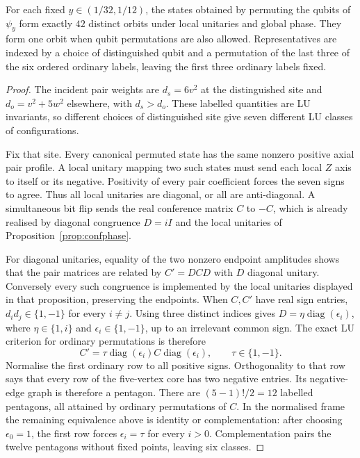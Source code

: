\begin{corollary}
\label{cor:icosahedral-labelled-orbits}
For each fixed $y\in(1/32,1/12)$, the states obtained by permuting the
qubits of $\psi_y$ form exactly $42$ distinct orbits under local unitaries
and global phase. They form one orbit when qubit permutations are also
allowed. Representatives are indexed by a choice of distinguished qubit
and a permutation of the last three of the six ordered ordinary labels,
leaving the first three ordinary labels fixed.
\end{corollary}
\begin{proof}
The incident pair weights are $d_s=6v^2$ at the distinguished site and
$d_o=v^2+5w^2$ elsewhere, with $d_s>d_o$. These labelled quantities are
LU invariants, so different choices of distinguished site give seven
different LU classes of configurations.

Fix that site. Every canonical permuted state has the same nonzero
positive axial pair profile. A local unitary mapping two such states
must send each local $Z$ axis to itself or its negative. Positivity of
every pair coefficient forces the seven signs to agree. Thus all local
unitaries are diagonal, or all are anti-diagonal. A simultaneous bit flip
sends the real conference matrix $C$ to $-C$, which is already realised
by diagonal congruence $D=iI$ and the local unitaries of
Proposition~\ref{prop:confphase}.

For diagonal unitaries, equality of the two nonzero endpoint amplitudes
shows that the pair matrices are related by $C'=DCD$ with $D$ diagonal
unitary. Conversely every such congruence is implemented by the local
unitaries displayed in that proposition, preserving the endpoints.
When $C,C'$ have real sign entries, $d_id_j\in\{1,-1\}$ for every
$i\ne j$. Using three distinct indices gives
$D=\eta\operatorname{diag}(\epsilon_i)$, where
$\eta\in\{1,i\}$ and $\epsilon_i\in\{1,-1\}$, up to an irrelevant
common sign. The exact LU criterion for ordinary permutations is therefore
\[
 C'=\tau\operatorname{diag}(\epsilon_i)
                C\operatorname{diag}(\epsilon_i),\qquad \tau\in\{1,-1\}.
\]
Normalise the first ordinary row to all positive signs. Orthogonality to
that row says that every row of the five-vertex core has two negative
entries. Its negative-edge graph is therefore a pentagon. There are
$(5-1)!/2=12$ labelled pentagons, all attained by ordinary permutations
of $C$. In the normalised frame the remaining equivalence above is
identity or complementation: after choosing $\epsilon_0=1$, the first
row forces $\epsilon_i=\tau$ for every $i>0$. Complementation pairs
the twelve pentagons without fixed points, leaving six classes.


\end{proof}
